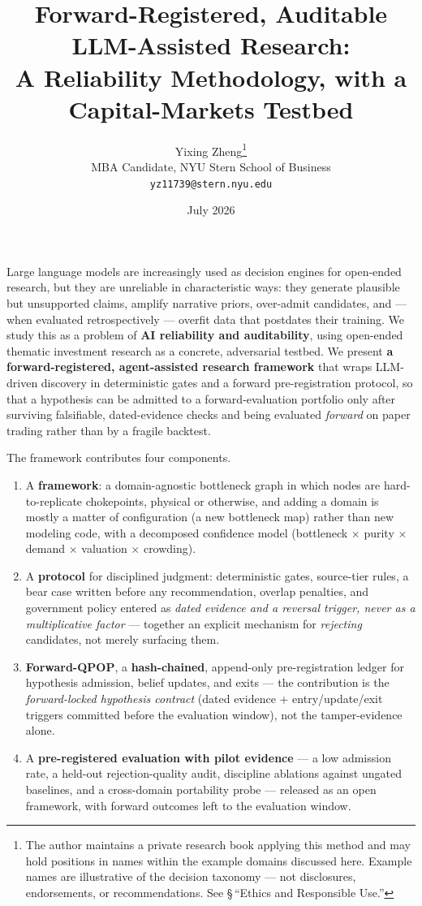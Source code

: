 \documentclass[11pt]{article}
\title{Forward-Registered, Auditable LLM-Assisted Research:\\
A Reliability Methodology, with a Capital-Markets Testbed}
\author{Yixing Zheng\thanks{The author maintains a private research book applying this method and
may hold positions in names within the example domains discussed here. Example names are illustrative
of the decision taxonomy --- not disclosures, endorsements, or recommendations. See
\S\,``Ethics and Responsible Use.''}\\
MBA Candidate, NYU Stern School of Business\\
\texttt{yz11739@stern.nyu.edu}}
\date{July 2026}
\renewenvironment{abstract}{\begin{center}\bfseries\abstractname\end{center}\par\noindent\ignorespaces}{\par\medskip}
\begin{document}
\maketitle

\begin{abstract}
Large language models are increasingly used as decision engines for open-ended research, but they
are unreliable in characteristic ways: they generate plausible but unsupported claims, amplify
narrative priors, over-admit candidates, and --- when evaluated retrospectively --- overfit data
that postdates their training. We study this as a problem of \textbf{AI reliability and
auditability}, using open-ended thematic investment research as a concrete, adversarial testbed. We
present \textbf{a forward-registered, agent-assisted research framework} that wraps LLM-driven
discovery in deterministic gates and a forward pre-registration protocol, so that a hypothesis can
be admitted to a forward-evaluation portfolio only after surviving falsifiable, dated-evidence
checks and being evaluated \emph{forward} on paper trading rather than by a fragile backtest.

The framework contributes four components.
\begin{enumerate}
  \item A \textbf{framework}: a domain-agnostic bottleneck graph
    in which nodes are hard-to-replicate chokepoints, physical or otherwise, and adding a domain is mostly a matter of configuration
    (a new bottleneck map) rather than new modeling code, with
    a decomposed confidence model (bottleneck $\times$ purity $\times$ demand $\times$ valuation $\times$ crowding).
  \item A \textbf{protocol} for disciplined judgment: deterministic gates, source-tier rules, a bear case written
    before any recommendation, overlap penalties, and government policy entered as \emph{dated evidence and a
    reversal trigger, never as a multiplicative factor} --- together an explicit mechanism for \emph{rejecting}
    candidates, not merely surfacing them.
  \item \textbf{Forward-QPOP}, a \textbf{hash-chained}, append-only
    pre-registration ledger for hypothesis admission, belief updates, and exits --- the contribution is
    the \emph{forward-locked hypothesis contract} (dated evidence + entry/update/exit triggers committed
    before the evaluation window), not the tamper-evidence alone.
  \item A \textbf{pre-registered evaluation with pilot evidence} --- a low admission rate, a held-out
    rejection-quality audit, discipline ablations against ungated baselines, and a cross-domain portability
    probe --- released as an open framework, with forward outcomes left to the evaluation window.
\end{enumerate}


\end{abstract}
\end{document}

